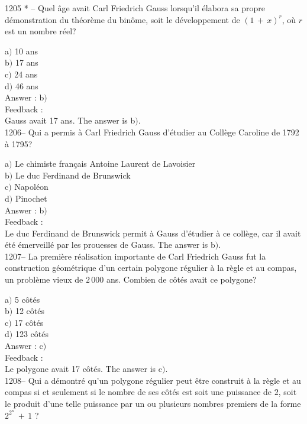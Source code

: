 ﻿\documentclass[letterpaper, 12pt]{article}
\begin{document}
1205 * -- Quel \^age avait Carl Friedrich Gauss lorsqu'il \'elabora
sa propre d\'emonstration du th\'eor\`eme du bin\^ome, soit le
d\'eveloppement de $(1\,+\,x)^r$, o\`u $r$ est un nombre r\'eel?

a$)$ 10 ans \\
b$)$ 17 ans \\
c$)$ 24 ans \\
d$)$ 46 ans\\

Answer : b$)$\\

Feedback : \\
Gauss avait 17 ans.
The answer is b$)$.\\

1206-- Qui a permis \`a Carl Friedrich Gauss d'\'etudier au
Coll\`ege Caroline de 1792 \`a 1795?

a$)$ Le chimiste fran\c cais Antoine Laurent de Lavoisier \\
b$)$ Le duc Ferdinand de Brunswick \\
c$)$ Napol\'eon \\
d$)$ Pinochet\\

Answer : b$)$\\

Feedback : \\
Le duc Ferdinand de Brunswick permit \`a Gauss d'\'etudier \`a ce
coll\`ege, car il avait \'et\'e \'emerveill\'e par les prouesses de
Gauss.
The answer is b$)$.\\

1207-- La premi\`ere r\'ealisation importante de Carl Friedrich
Gauss fut la construction g\'eom\'etrique d'un certain polygone
r\'egulier \`a la r\`egle et au compas, un probl\`eme vieux de
$2\,000$ ans. Combien de c\^ot\'es avait ce polygone?

a$)$ 5 c\^ot\'es\\
b$)$ 12 c\^ot\'es\\
c$)$ 17 c\^ot\'es\\
d$)$ 123 c\^ot\'es\\

Answer : c$)$\\

Feedback : \\
Le polygone avait 17 c\^ot\'es.
The answer is c$)$.\\

1208-- Qui a d\'emontr\'e qu'un polygone r\'egulier peut \^etre
construit \`a la r\`egle et au compas si et seulement si le nombre
de ses c\^ot\'es est soit une puissance de $2$, soit le produit
d'une telle puissance par un ou plusieurs nombres premiers de la
forme $2^{2^n}\,+\,1$ ?
\end{document}
